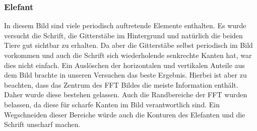 \documentclass[12pt,german]{article}
\begin{document}
\subsubsection{Elefant}
In diesem Bild sind viele periodisch auftretende Elemente enthalten. Es wurde versucht die Schrift, die Gitterstäbe im Hintergrund und natürlich die beiden Tiere gut sichtbar zu erhalten. Da aber die Gitterstäbe selbst periodisch im Bild vorkommen und auch die Schrift sich wiederholende senkrechte Kanten hat, war dies nicht einfach. Ein Auslöschen der horizontalen und vertikalen Anteile aus dem Bild brachte in unseren Versuchen das beste Ergebnis. Hierbei ist aber zu beachten, dass das Zentrum des FFT Bildes die meiste Information enthält. Daher wurde diese bestehen gelassen. Auch die Randbereiche der FFT wurden belassen, da diese für scharfe Kanten im Bild verantwortlich sind. Ein Wegschneiden dieser Bereiche würde auch die Konturen des Elefanten und die Schrift unscharf machen.
\end{document}

